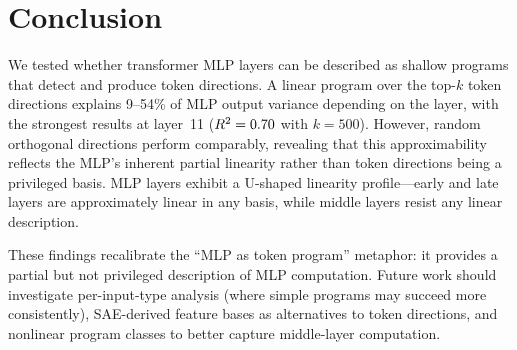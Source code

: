 \section{Conclusion}
\label{sec:conclusion}

We tested whether transformer MLP layers can be described as shallow programs that detect and produce token directions.
A linear program over the top-$k$ token directions explains 9--54\% of MLP output variance depending on the layer, with the strongest results at layer~11 ($R^2 = 0.70$ with $k=500$).
However, random orthogonal directions perform comparably, revealing that this approximability reflects the MLP's inherent partial linearity rather than token directions being a privileged basis.
MLP layers exhibit a U-shaped linearity profile---early and late layers are approximately linear in any basis, while middle layers resist any linear description.

These findings recalibrate the ``MLP as token program'' metaphor: it provides a partial but not privileged description of MLP computation.
Future work should investigate per-input-type analysis (where simple programs may succeed more consistently), SAE-derived feature bases as alternatives to token directions, and nonlinear program classes to better capture middle-layer computation.
